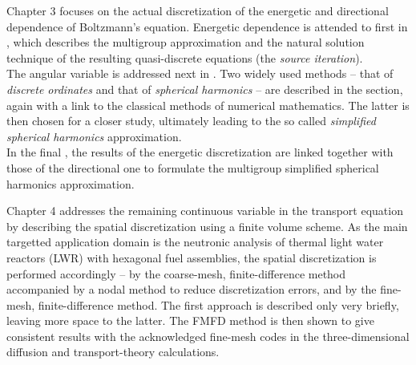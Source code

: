Chapter 3 focuses on the actual discretization of the energetic and directional dependence of Boltzmann's equation.
Energetic dependence is attended to first in , which describes the multigroup approximation and the
natural solution technique of the resulting quasi-discrete equations (the \textit{source iteration}).\\
\indent The angular variable is addressed next in . Two widely used methods -- that of
\textit{discrete ordinates} and that of \textit{spherical harmonics} -- are described in the section, again with a link
to the classical methods of numerical mathematics. The latter is then chosen for a closer study, ultimately leading to
the so called \textit{simplified spherical harmonics} approximation.\\
\indent In the final , the results of the energetic discretization are linked together with those of the
directional one to formulate the multigroup simplified spherical harmonics approximation.

Chapter 4 addresses the remaining continuous variable in the transport equation by describing the spatial discretization
using a finite volume scheme. As the  main targetted application domain is the neutronic analysis of thermal light water
reactors (LWR) with hexagonal fuel assemblies, the
spatial discretization is performed accordingly -- by the coarse-mesh, finite-difference method accompanied by a nodal
method to reduce discretization errors, and by the fine-mesh, finite-difference method. The first approach is described
only very briefly, leaving more space to the latter. The FMFD method is then shown to give consistent results with the
acknowledged fine-mesh codes in the three-dimensional diffusion and transport-theory calculations.

